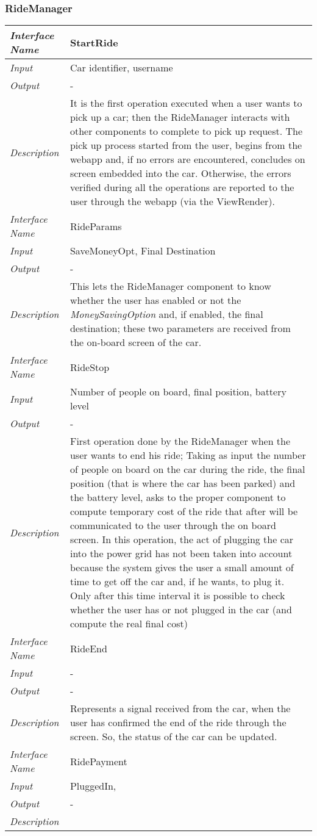 \documentclass[11pt,a4paper]{report}
\begin{document}
\subsubsection{RideManager}
\begin{tabularx}{\textwidth}{|>{\em}l|X|}
	\hline
	Interface Name& StartRide\\
	\hline
	Input & Car identifier, username\\
	\hline
	Output & -\\
	\hline
	Description &It is the first operation executed when a user wants to pick up a car; then the RideManager interacts with other components to complete to pick up request. The pick up process started from the user, begins from the webapp and, if no errors are encountered, concludes on screen embedded into the car. Otherwise, the errors verified during all the operations are reported to the user through the webapp (via the ViewRender).\\
	\hline
	\hline
	Interface Name& RideParams\\
	\hline
	Input &SaveMoneyOpt, Final Destination\\
	\hline
	Output & -\\
	\hline
	Description &This lets the RideManager component to know whether the user has enabled or not the \textit{MoneySavingOption} and, if enabled, the final destination; these two parameters are received from the on-board screen of the car.\\
	\hline
	\hline
	Interface Name& RideStop\\
	\hline
	Input &Number of people on board, final position, battery level\\
	\hline
	Output & -\\
	\hline
	Description &First operation done by the RideManager when the user wants to end his ride; Taking as input the number of people on board on the car during the ride, the final position (that is where the car has been parked) and the battery level, asks to the proper component to compute temporary cost of the ride that after will be communicated to the user through the on board screen. In this operation, the act of plugging the car into the power grid has not been taken into account because the system gives the user a small amount of time to get off the car and, if he wants, to plug it. Only after this time interval it is possible to check whether the user has or not plugged in the car (and compute the real final cost)\\
	\hline
	\hline
	Interface Name& RideEnd\\
	\hline
	Input &-\\
	\hline
	Output & -\\
	\hline
	Description &Represents a signal received from the car, when the user has confirmed the end of the ride through the screen. So, the status of the car can be updated.\\
	\hline
	\hline
	Interface Name& RidePayment\\ %
	\hline
	Input &PluggedIn, \\
	\hline
	Output & -\\
	\hline
	Description &\\
	\hline
\end{tabularx}
\end{document}

